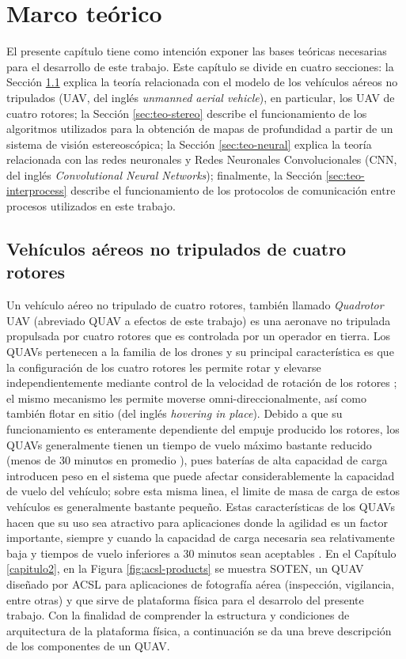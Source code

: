 \chapter{Marco teórico}
\label{capitulo3}

El presente capítulo tiene como intención exponer las bases teóricas necesarias para el desarrollo de este trabajo. Este capítulo se divide en cuatro secciones: la Sección \ref{sec:teo-uav} explica la teoría relacionada con el modelo de los vehículos aéreos no tripulados (UAV, del inglés \textit{unmanned aerial vehicle}), en particular, los UAV de cuatro rotores; la Sección \ref{sec:teo-stereo} describe el funcionamiento de los algoritmos utilizados para la obtención de mapas de profundidad a partir de un sistema de visión estereoscópica; la Sección \ref{sec:teo-neural} explica la teoría relacionada con las redes neuronales y Redes Neuronales Convolucionales (CNN, del inglés \textit{Convolutional Neural Networks}); finalmente, la Sección \ref{sec:teo-interprocess} describe el funcionamiento de los protocolos de comunicación entre procesos utilizados en este trabajo.

\section{Vehículos aéreos no tripulados de cuatro rotores}
\label{sec:teo-uav}

Un vehículo aéreo no tripulado de cuatro rotores, también llamado \textit{Quadrotor} UAV (abreviado QUAV a efectos de este trabajo) es una aeronave no tripulada propulsada por cuatro rotores que es controlada por un operador en tierra. Los QUAVs pertenecen a la familia de los drones y su principal característica es que la configuración de los cuatro rotores les permite rotar y elevarse independientemente mediante control de la velocidad de rotación de los rotores \cite{multidrone2017review}; el mismo mecanismo les permite moverse omni-direccionalmente, así como también flotar en sitio (del inglés \textit{hovering in place}). Debido a que su funcionamiento es enteramente dependiente del empuje producido los rotores, los QUAVs generalmente tienen un tiempo de vuelo máximo bastante reducido (menos de 30 minutos en promedio \cite{multidrone2017review}), pues baterías de alta capacidad de carga introducen peso en el sistema que puede afectar considerablemente la capacidad de vuelo del vehículo; sobre esta misma linea, el limite de masa de carga de estos vehículos es generalmente bastante pequeño. Estas características de los QUAVs hacen que su uso sea atractivo para aplicaciones donde la agilidad es un factor importante, siempre y cuando la capacidad de carga necesaria sea relativamente baja y tiempos de vuelo inferiores a 30 minutos sean aceptables \cite{multidrone2017review}. En el Capítulo \ref{capitulo2}, en la Figura \ref{fig:acsl-products} se muestra SOTEN, un QUAV diseñado por ACSL para aplicaciones de fotografía aérea (inspección, vigilancia, entre otras) y que sirve de plataforma física para el desarrolo del presente trabajo. Con la finalidad de comprender la estructura y condiciones de arquitectura de la plataforma física, a continuación se da una breve descripción de los componentes de un QUAV. 

